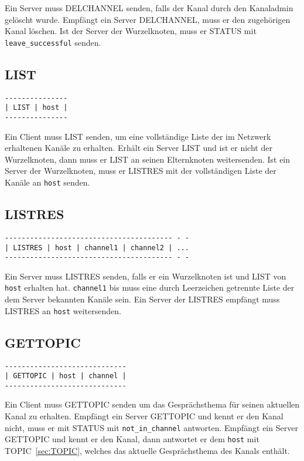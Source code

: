 \documentclass{article}
\begin{document}
Ein Server muss DELCHANNEL senden, falls der Kanal durch den Kanaladmin gelöscht wurde.
Empfängt ein Server DELCHANNEL, muss er den zugehörigen Kanal löschen.
Ist der Server der Wurzelknoten, muss er STATUS mit \lstinline{leave_successful} senden.

\subsection{LIST}

\begin{lstlisting}
---------------
| LIST | host |
---------------
\end{lstlisting}

Ein Client muss LIST senden, um eine vollständige Liste der im Netzwerk erhaltenen Kanäle zu erhalten.
Erhält ein Server LIST und ist er nicht der Wurzelknoten, dann muss er LIST an seinen Elternknoten weitersenden.
Ist ein Server der Wurzelknoten, muss er LISTRES mit der vollständigen Liste der Kanäle an \lstinline{host} senden.

\subsection{LISTRES}

\begin{lstlisting}
---------------------------------------- - -
| LISTRES | host | channel1 | channel2 | ...
---------------------------------------- - -
\end{lstlisting}

Ein Server muss LISTRES senden, falls er ein Wurzelknoten ist und LIST von \lstinline{host} erhalten hat.
\lstinline{channel1} bis  muss eine durch Leerzeichen getrennte Liste der dem Server bekannten Kanäle sein.
Ein Server der LISTRES empfängt muss LISTRES an \lstinline{host} weitersenden.

\subsection{GETTOPIC}

\begin{lstlisting}
-----------------------------
| GETTOPIC | host | channel |
-----------------------------
\end{lstlisting}

Ein Client muss GETTOPIC senden um das Gesprächsthema für seinen aktuellen Kanal zu erhalten.
Empfängt ein Server GETTOPIC und kennt er den Kanal nicht, muss er mit STATUS mit \lstinline{not_in_channel} antworten.
Empfängt ein Server GETTOPIC und kennt er den Kanal, dann antwortet er dem \lstinline{host} mit TOPIC~\ref{sec:TOPIC}, welches das aktuelle Gesprächsthema des Kanals enthält.
\end{document}
